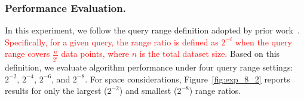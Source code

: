 \documentclass[sigconf, nonacm]{acmart}
\begin{document}
{	
	\subsubsection{Performance Evaluation. }
	
	In this experiment, we follow the query range definition adopted by prior work~\cite{HQI}. \textcolor{red}{Specifically, for a given query, the range ratio is defined as $2^{-i}$	when the query range covers $\frac{n}{2^i}$ data points, where $n$ is the total dataset size.}
	Based on this definition, we evaluate algorithm performance under four query range settings: $2^{-2}$, $2^{-4}$, $2^{-6}$, and $2^{-8}$. For space considerations, Figure~\ref{fig:exp_8_2} reports results for only the largest ($2^{-2}$) and smallest ($2^{-8}$) range ratios. 
	
	
}
\end{document}
